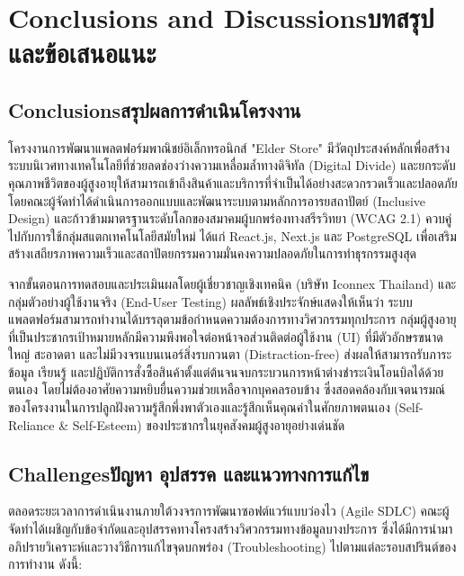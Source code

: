 \chapter{\ifenglish Conclusions and Discussions\else บทสรุปและข้อเสนอแนะ\fi}

\section{\ifenglish Conclusions\else สรุปผลการดำเนินโครงงาน\fi}
โครงงานการพัฒนาแพลตฟอร์มพาณิชย์อิเล็กทรอนิกส์ "Elder Store" มีวัตถุประสงค์หลักเพื่อสร้างระบบนิเวศทางเทคโนโลยีที่ช่วยลดช่องว่างความเหลื่อมล้ำทางดิจิทัล (Digital Divide) \cite{wai_older_users} และยกระดับคุณภาพชีวิตของผู้สูงอายุให้สามารถเข้าถึงสินค้าและบริการที่จำเป็นได้อย่างสะดวกรวดเร็วและปลอดภัย โดยคณะผู้จัดทำได้ดำเนินการออกแบบและพัฒนาระบบตามหลักการอารยสถาปัตย์ (Inclusive Design) \cite{inclusive2022} และก้าวข้ามมาตรฐานระดับโลกของสมาคมผู้บกพร่องทางสรีรวิทยา (WCAG 2.1) \cite{wcag2023} ควบคู่ไปกับการใช้กลุ่มสแตกเทคโนโลยีสมัยใหม่ ได้แก่ React.js, Next.js และ PostgreSQL เพื่อเสริมสร้างเสถียรภาพความเร็วและสถาปัตยกรรมความมั่นคงความปลอดภัยในการทำธุรกรรมสูงสุด \cite{pressman2014}

จากขั้นตอนการทดสอบและประเมินผลโดยผู้เชี่ยวชาญเชิงเทคนิค (บริษัท Iconnex Thailand) และกลุ่มตัวอย่างผู้ใช้งานจริง (End-User Testing) ผลลัพธ์เชิงประจักษ์แสดงให้เห็นว่า ระบบแพลตฟอร์มสามารถทำงานได้บรรลุตามข้อกำหนดความต้องการทางวิศวกรรมทุกประการ กลุ่มผู้สูงอายุที่เป็นประชากรเป้าหมายหลักมีความพึงพอใจต่อหน้าจอส่วนติดต่อผู้ใช้งาน (UI) ที่มีตัวอักษรขนาดใหญ่ สะอาดตา และไม่มีวงจรแบนเนอร์สิ่งรบกวนตา (Distraction-free) \cite{krug2000} ส่งผลให้สามารถรับภาระข้อมูล เรียนรู้ และปฏิบัติการสั่งซื้อสินค้าตั้งแต่ต้นจนจบกระบวนการหน้าต่างชำระเงินโอนบิลได้ด้วยตนเอง โดยไม่ต้องอาศัยความหยิบยื่นความช่วยเหลือจากบุคคลรอบข้าง ซึ่งสอดคล้องกับเจตนารมณ์ของโครงงานในการปลูกฝังความรู้สึกพึ่งพาตัวเองและรู้สึกเห็นคุณค่าในศักยภาพตนเอง (Self-Reliance \& Self-Esteem) ของประชากรในยุคสังคมผู้สูงอายุอย่างเด่นชัด

\section{\ifenglish Challenges\else ปัญหา อุปสรรค และแนวทางการแก้ไข\fi}
ตลอดระยะเวลาการดำเนินงานภายใต้วงจรการพัฒนาซอฟต์แวร์แบบว่องไว (Agile SDLC) \cite{beck2001} คณะผู้จัดทำได้เผชิญกับข้อจำกัดและอุปสรรคทางโครงสร้างวิศวกรรมทางข้อมูลบางประการ ซึ่งได้มีการนำมาอภิปรายวิเคราะห์และวางวิธีการแก้ไขจุดบกพร่อง (Troubleshooting) ไปตามแต่ละรอบสปรินต์ของการทำงาน ดังนี้:

